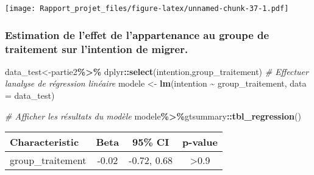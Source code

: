 \documentclass[
]{article}
\newenvironment{Shaded}{\begin{snugshade}}{\end{snugshade}}
\newcommand{\AttributeTok}[1]{\textcolor[rgb]{0.13,0.29,0.53}{#1}}
\newcommand{\CommentTok}[1]{\textcolor[rgb]{0.56,0.35,0.01}{\textit{#1}}}
\newcommand{\FunctionTok}[1]{\textcolor[rgb]{0.13,0.29,0.53}{\textbf{#1}}}
\newcommand{\NormalTok}[1]{#1}
\newcommand{\OtherTok}[1]{\textcolor[rgb]{0.56,0.35,0.01}{#1}}
\newcommand{\SpecialCharTok}[1]{\textcolor[rgb]{0.81,0.36,0.00}{\textbf{#1}}}
\begin{document}
\texttt{[image: Rapport\_projet\_files/figure-latex/unnamed-chunk-37-1.pdf]}

\hypertarget{estimation-de-leffet-de-lappartenance-au-groupe-de-traitement-sur-lintention-de-migrer.}{%
\subsubsection{Estimation de l'effet de l'appartenance au groupe de
traitement sur l'intention de
migrer.}\label{estimation-de-leffet-de-lappartenance-au-groupe-de-traitement-sur-lintention-de-migrer.}}

\begin{Shaded}
\begin{Highlighting}[]
\NormalTok{data\_test}\OtherTok{\textless{}{-}}\NormalTok{partie2}\SpecialCharTok{\%\textgreater{}\%}\NormalTok{ dplyr}\SpecialCharTok{::}\FunctionTok{select}\NormalTok{(intention,group\_traitement)}
\CommentTok{\# Effectuer l\textquotesingle{}analyse de régression linéaire}
\NormalTok{modele }\OtherTok{\textless{}{-}} \FunctionTok{lm}\NormalTok{(intention }\SpecialCharTok{\textasciitilde{}}\NormalTok{ group\_traitement, }\AttributeTok{data =}\NormalTok{ data\_test)}

\CommentTok{\# Afficher les résultats du modèle}
\NormalTok{modele}\SpecialCharTok{\%\textgreater{}\%}\NormalTok{gtsummary}\SpecialCharTok{::}\FunctionTok{tbl\_regression}\NormalTok{()}
\end{Highlighting}
\end{Shaded}

\begin{longtable}[]{@{}lccc@{}}
\toprule\noalign{}
\textbf{Characteristic} & \textbf{Beta} & \textbf{95\% CI} &
\textbf{p-value} \\
\midrule\noalign{}
\endhead
\bottomrule\noalign{}
\endlastfoot
group\_traitement & -0.02 & -0.72, 0.68 & \textgreater0.9 \\
\end{longtable}
\end{document}
